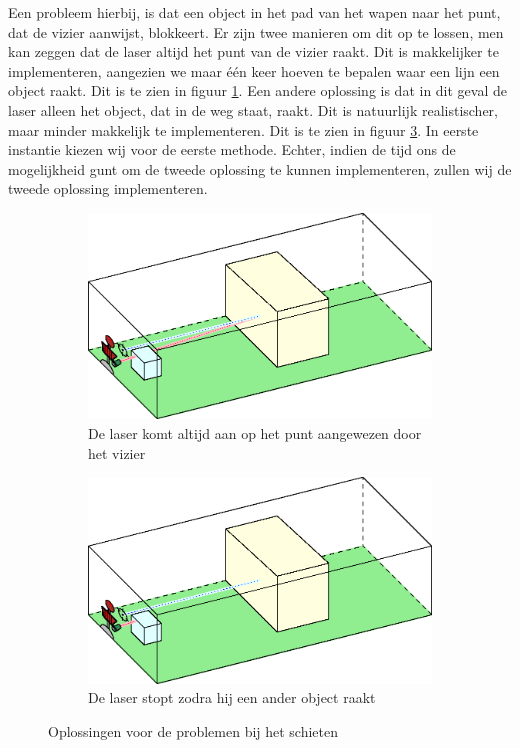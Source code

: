 Een probleem hierbij, is dat een object in het pad van het wapen naar het punt, dat de vizier aanwijst, blokkeert. Er zijn twee manieren om dit op te lossen, men kan zeggen dat de laser altijd het punt van de vizier raakt. Dit is makkelijker te implementeren, aangezien we maar \'e\'en keer hoeven te bepalen waar een lijn een object raakt. Dit is te zien in figuur \ref{fig:COL2}. Een andere oplossing is dat in dit geval de laser alleen het object, dat in de weg staat, raakt. Dit is natuurlijk realistischer, maar minder makkelijk te implementeren. Dit is te zien in figuur \ref{fig:COL3}. In eerste instantie kiezen wij voor de eerste methode. Echter, indien de tijd ons de mogelijkheid gunt om de tweede oplossing te kunnen implementeren, zullen wij de tweede oplossing implementeren.
\FloatBarrier
\begin{figure}[h]
\begin{subfigure}{0.45\textwidth}
\centering
\includegraphics[width=\textwidth]{Graphics/Collision2.eps}
\caption{De laser komt altijd aan op het punt aangewezen door het vizier}
\label{fig:COL2}
\end{subfigure}
\begin{subfigure}{0.45\textwidth}
\centering
\includegraphics[width=\textwidth]{Graphics/Collision3.eps}
\caption{De laser stopt zodra hij een ander object raakt}
\label{fig:COL3}
\end{subfigure}
\caption{Oplossingen voor de problemen bij het schieten}
\end{figure}
\FloatBarrier
